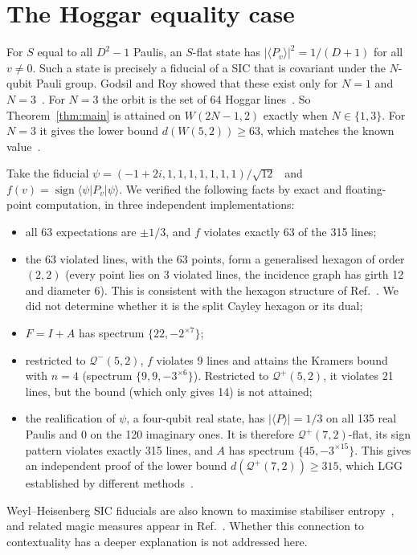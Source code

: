 \documentclass[aps,pra,onecolumn,11pt,superscriptaddress,nofootinbib]{revtex4-2}
\theoremstyle{definition}
\theoremstyle{remark}
\newcommand{\Qp}{\mathcal{Q}^{+}}
\newcommand{\Qm}{\mathcal{Q}^{-}}
\begin{document}
\section{The Hoggar equality case}

For $S$ equal to all $D^2-1$ Paulis, an $S$-flat state has $|\langle P_v\rangle|^2=1/(D+1)$ for
all $v\neq0$. Such a state is precisely a fiducial of a SIC that is covariant under the
$N$-qubit Pauli group. Godsil and Roy showed that these exist only for $N=1$ and
$N=3$~\cite{GodsilRoy2009}. For $N=3$ the orbit is the set of 64 Hoggar
lines~\cite{Stacey2016,Zhu2015}. So Theorem~\ref{thm:main} is attained on $W(2N-1,2)$ exactly
when $N\in\{1,3\}$. For $N=3$ it gives the lower bound $d(W(5,2))\ge63$, which matches the
known value~\cite{deBoutray2022,Muller2024}.

Take the fiducial $\psi=(-1+2i,1,1,1,1,1,1,1)/\sqrt{12}$~\cite{Stacey2016} and
$f(v)=\operatorname{sign}\langle\psi|P_v|\psi\rangle$. We verified the following facts by
exact and floating-point computation, in three independent implementations:
\begin{itemize}
\item all 63 expectations are $\pm1/3$, and $f$ violates exactly 63 of the 315 lines;
\item the 63 violated lines, with the 63 points, form a generalised hexagon of order $(2,2)$
(every point lies on 3 violated lines, the incidence graph has girth 12 and diameter 6).
This is consistent with the hexagon structure of Ref.~\cite{Saniga2025hex}. We did not
determine whether it is the split Cayley hexagon or its dual;
\item $F=I+A$ has spectrum $\{22,-2^{\times7}\}$;
\item restricted to $\Qm(5,2)$, $f$ violates 9 lines and attains the Kramers bound with $n=4$
(spectrum $\{9,9,-3^{\times6}\}$). Restricted to $\Qp(5,2)$, it violates 21 lines, but the
bound (which only gives 14) is not attained;
\item the realification of $\psi$, a four-qubit real state, has $|\langle P\rangle|=1/3$ on all
135 real Paulis and $0$ on the 120 imaginary ones. It is therefore $\Qp(7,2)$-flat, its sign
pattern violates exactly 315 lines, and $A$ has spectrum $\{45,-3^{\times15}\}$. This gives an
independent proof of the lower bound $d(\Qp(7,2))\ge315$, which LGG established by
different methods~\cite{LGG2026}.
\end{itemize}
Weyl--Heisenberg SIC fiducials are also known to maximise stabiliser
entropy~\cite{CuffaroFuchs2024}, and related magic measures appear in
Ref.~\cite{HowardCampbell2017}. Whether this connection to contextuality has a deeper explanation is
not addressed here.
\end{document}
